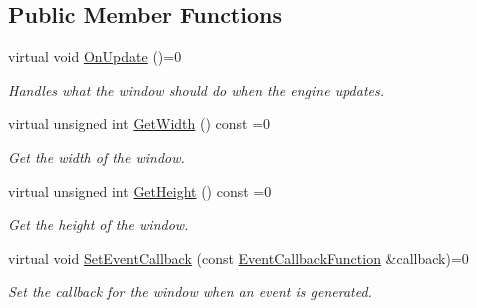 \subsection*{Public Member Functions}
\begin{DoxyCompactItemize}
\item 
\mbox{\label{classengine_1_1Window_a4ded827d5389fe158daf76df45884bf2}} 
virtual void \hyperlink{classengine_1_1Window_a4ded827d5389fe158daf76df45884bf2}{On\+Update} ()=0
\begin{DoxyCompactList}\small\item\em Handles what the window should do when the engine updates. \end{DoxyCompactList}\item 
\mbox{\label{classengine_1_1Window_a5969984ab8a150119367a43ab8d0ffd1}} 
virtual unsigned int \hyperlink{classengine_1_1Window_a5969984ab8a150119367a43ab8d0ffd1}{Get\+Width} () const =0
\begin{DoxyCompactList}\small\item\em Get the width of the window. \end{DoxyCompactList}\item 
\mbox{\label{classengine_1_1Window_a19464c47ee28b320979a3255a92ccf3f}} 
virtual unsigned int \hyperlink{classengine_1_1Window_a19464c47ee28b320979a3255a92ccf3f}{Get\+Height} () const =0
\begin{DoxyCompactList}\small\item\em Get the height of the window. \end{DoxyCompactList}\item 
\mbox{\label{classengine_1_1Window_afca9bd918d022b0e91d8b274648b1324}} 
virtual void \hyperlink{classengine_1_1Window_afca9bd918d022b0e91d8b274648b1324}{Set\+Event\+Callback} (const \hyperlink{classengine_1_1Window_a011d2563cc695bbc6a9fe2e64a29bd2f}{Event\+Callback\+Function} \&callback)=0
\begin{DoxyCompactList}\small\item\em Set the callback for the window when an event is generated. \end{DoxyCompactList}\item 
\mbox{\label{classengine_1_1Window_a17dd0ec2fd18f4ee6a56ebbed211f45d}} 

\end{DoxyCompactItemize}
